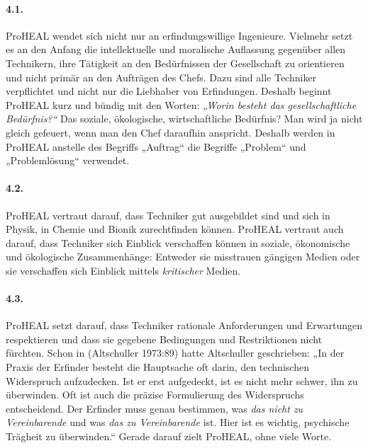 \documentclass[12pt,a4paper]{article}
\begin{document}
\paragraph{4.1.}
ProHEAL wendet sich nicht nur an erfindungswillige Ingenieure. Vielmehr
setzt es an den Anfang die intellektuelle und moralische Auflassung gegenüber
allen Technikern, ihre Tätigkeit an den Bedürfnissen der Gesellschaft zu
orientieren und nicht primär an den Aufträgen des Chefs. Dazu sind alle
Techniker verpflichtet und nicht nur die Liebhaber von Erfindungen. Deshalb
beginnt ProHEAL kurz und bündig mit den Worten: \emph{„Worin besteht das
  gesellschaftliche Bedürfnis?“} Das soziale, ökologische, wirtschaftliche
Bedürfnis? Man wird ja nicht gleich gefeuert, wenn man den Chef daraufhin
anspricht. Deshalb werden in ProHEAL anstelle des Begriffs „Auftrag“ die
Begriffe „Problem“ und „Problemlösung“ verwendet.

\paragraph{4.2.}
ProHEAL vertraut darauf, dass Techniker gut ausgebildet sind und sich in
Physik, in Chemie und Bionik zurechtfinden können. ProHEAL vertraut auch
darauf, dass Techniker sich Einblick verschaffen können in soziale,
ökonomische und ökologische Zusammenhänge: Entweder sie misstrauen gängigen
Medien oder sie verschaffen sich Einblick mittels \emph{kritischer} Medien.

\paragraph{4.3.}
ProHEAL setzt darauf, dass Techniker rationale Anforderungen und Erwartungen
respektieren und dass sie gegebene Bedingungen und Restriktionen nicht
fürchten.  Schon in (Altschuller 1973:89) hatte Altschuller geschrieben: „In
der Praxis der Erfinder besteht die Hauptsache oft darin, den technischen
Widerspruch aufzudecken. Ist er erst aufgedeckt, ist es nicht mehr schwer, ihn
zu überwinden. Oft ist auch die präzise Formulierung des Widerspruchs
entscheidend. Der Erfinder muss genau bestimmen, was \emph{das nicht zu
  Vereinbarende} und was \emph{das zu Vereinbarende} ist. Hier ist es wichtig,
psychische Trägheit zu überwinden.“ Gerade darauf zielt ProHEAL, ohne viele
Worte.
\end{document}
